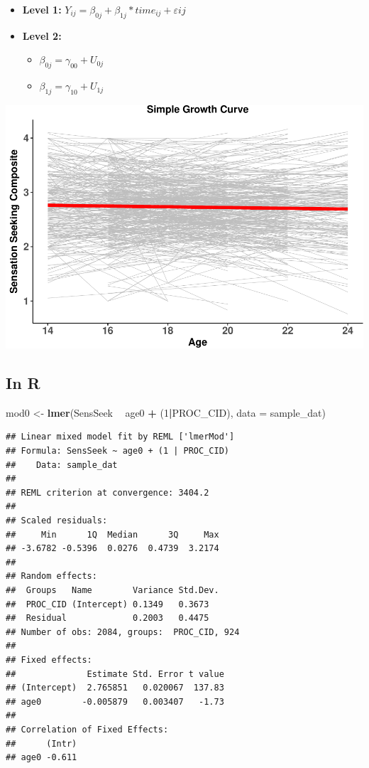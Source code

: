 \documentclass[]{article}
\newenvironment{Shaded}{\begin{snugshade}}{\end{snugshade}}
\newcommand{\KeywordTok}[1]{\textcolor[rgb]{0.13,0.29,0.53}{\textbf{#1}}}
\newcommand{\DataTypeTok}[1]{\textcolor[rgb]{0.13,0.29,0.53}{#1}}
\newcommand{\DecValTok}[1]{\textcolor[rgb]{0.00,0.00,0.81}{#1}}
\newcommand{\StringTok}[1]{\textcolor[rgb]{0.31,0.60,0.02}{#1}}
\newcommand{\OperatorTok}[1]{\textcolor[rgb]{0.81,0.36,0.00}{\textbf{#1}}}
\newcommand{\NormalTok}[1]{#1}
\begin{document}
\begin{itemize}
  \item \textbf{Level 1:} $Y_{ij} = \beta_{0j} + \beta_{1j}*time_{ij} + \varepsilon{ij}$
  \item \textbf{Level 2:} 
    \begin{itemize} 
      \item $\beta_{0j} = \gamma_{00} + U_{0j}$
      \item $\beta_{1j} = \gamma_{10} + U_{1j}$
    \end{itemize}
\end{itemize}

\includegraphics{Conditional_Models_doc_files/figure-latex/unnamed-chunk-3-1.pdf}

\subsection{In R}\label{in-r}

\small

\begin{Shaded}
\begin{Highlighting}[]
\NormalTok{mod0 <-}\StringTok{ }\KeywordTok{lmer}\NormalTok{(SensSeek }\OperatorTok{~}\StringTok{ }\NormalTok{age0 }\OperatorTok{+}\StringTok{ }\NormalTok{(}\DecValTok{1}\OperatorTok{|}\NormalTok{PROC_CID), }\DataTypeTok{data =}\NormalTok{ sample_dat)}
\end{Highlighting}
\end{Shaded}

\centering
\small

\begin{verbatim}
## Linear mixed model fit by REML ['lmerMod']
## Formula: SensSeek ~ age0 + (1 | PROC_CID)
##    Data: sample_dat
## 
## REML criterion at convergence: 3404.2
## 
## Scaled residuals: 
##     Min      1Q  Median      3Q     Max 
## -3.6782 -0.5396  0.0276  0.4739  3.2174 
## 
## Random effects:
##  Groups   Name        Variance Std.Dev.
##  PROC_CID (Intercept) 0.1349   0.3673  
##  Residual             0.2003   0.4475  
## Number of obs: 2084, groups:  PROC_CID, 924
## 
## Fixed effects:
##              Estimate Std. Error t value
## (Intercept)  2.765851   0.020067  137.83
## age0        -0.005879   0.003407   -1.73
## 
## Correlation of Fixed Effects:
##      (Intr)
## age0 -0.611
\end{verbatim}
\end{document}
